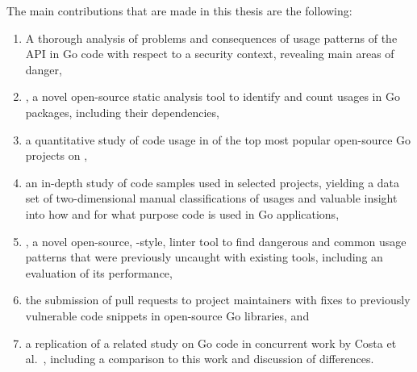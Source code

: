 The main contributions that are made in this thesis are the following:

\begin{enumerate}
    \item A thorough analysis of problems and consequences of usage patterns of the \unsafe{} \acrshort{API} in Go code
    with respect to a security context, revealing  main areas of danger,

    \item \toolGeiger, a novel open-source static analysis tool to identify and count \unsafe{} usages in Go packages,
    including their dependencies,

    \item a quantitative study of \unsafe{} code usage in \projsAnalyzed{} of the top \projsTotal{} most popular
    open-source Go projects on \github{},

    \item an in-depth study of \numberLabeledCodeSnippets{} code samples used in \projsForLabeledCodeSnippets{} selected
    projects, yielding a data set of two-dimensional manual classifications of usages and valuable insight into how and
    for what purpose \unsafe{} code is used in Go applications,

    \item \toolSafer{}, a novel open-source, \toolVet{}-style, linter tool to find  dangerous and common
    \unsafe{} usage patterns that were previously uncaught with existing tools, including an evaluation of its
    performance,

    \item the submission of \numberPRs{} pull requests to project maintainers with fixes to \numberBugsFixed{}
    previously vulnerable code snippets in open-source Go libraries, and

    \item a replication of a related study on \unsafe{} Go code in concurrent work by Costa et al.~\cite{costa2020},
    including a comparison to this work and discussion of differences.
\end{enumerate}

